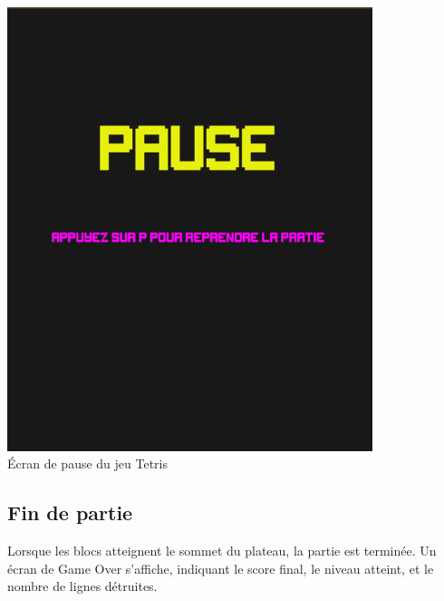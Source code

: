 \documentclass[12pt,a4paper]{report}
\begin{document}
\begin{center}
    \includegraphics[width=0.8\textwidth]{Figure_Pause.png}
    \\
    \caption{Écran de pause du jeu Tetris}
    \label{fig:pause}
\end{center}

\newpage
\subsection{Fin de partie}
Lorsque les blocs atteignent le sommet du plateau, la partie est terminée. Un écran de Game Over s'affiche, indiquant le score final, le niveau atteint, et le nombre de lignes détruites.
\end{document}
